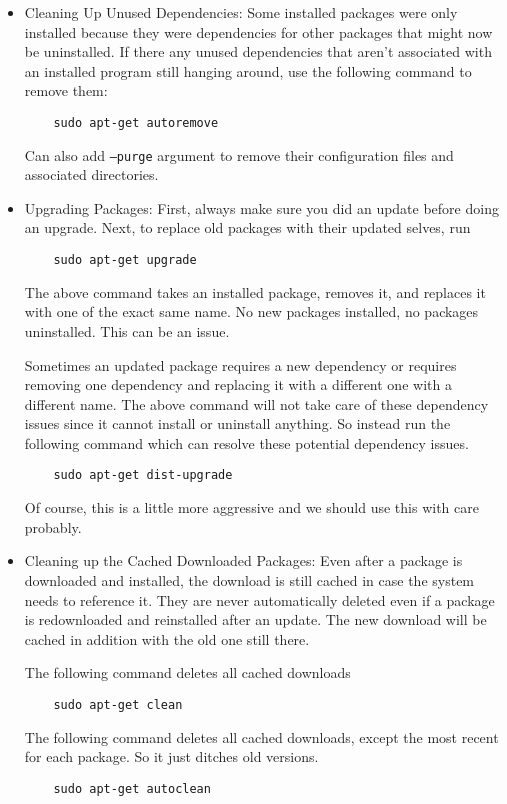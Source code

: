 \documentclass[12pt]{article}
\theoremstyle{plain}
\theoremstyle{definition}
\theoremstyle{remark}
\begin{document}
\begin{itemize}
  \item Cleaning Up Unused Dependencies:
    Some installed packages were only installed because they were
    dependencies for other packages that might now be uninstalled.
    If there any unused dependencies that aren't associated with an
    installed program still hanging around, use the following command to
    remove them:
    \begin{lstlisting}
    sudo apt-get autoremove
    \end{lstlisting}
    Can also add \texttt{--purge} argument to remove their configuration
    files and associated directories.

  \item Upgrading Packages:
    First, always make sure you did an update before doing an upgrade.
    Next, to replace old packages with their updated selves, run
    \begin{lstlisting}
    sudo apt-get upgrade
    \end{lstlisting}
    The above command takes an installed package, removes it, and
    replaces it with one of the exact same name.
    No new packages installed, no packages uninstalled.
    This can be an issue.

    Sometimes an updated package requires a new dependency or requires
    removing one dependency and replacing it with a different one with a
    different name.
    The above command will not take care of these dependency issues
    since it cannot install or uninstall anything.
    So instead run the following command which can resolve these
    potential dependency issues.
    \begin{lstlisting}
    sudo apt-get dist-upgrade
    \end{lstlisting}
    Of course, this is a little more aggressive and we should use this
    with care probably.

  \item Cleaning up the Cached Downloaded Packages:
    Even after a package is downloaded and installed, the download is
    still cached in case the system needs to reference it.
    They are never automatically deleted even if a package is
    redownloaded and reinstalled after an update. The new download will
    be cached in addition with the old one still there.

    The following command deletes all cached downloads
    \begin{lstlisting}
    sudo apt-get clean
    \end{lstlisting}
    The following command deletes all cached downloads, except the most
    recent for each package. So it just ditches old versions.
    \begin{lstlisting}
    sudo apt-get autoclean
    \end{lstlisting}


\end{itemize}
\end{document}
